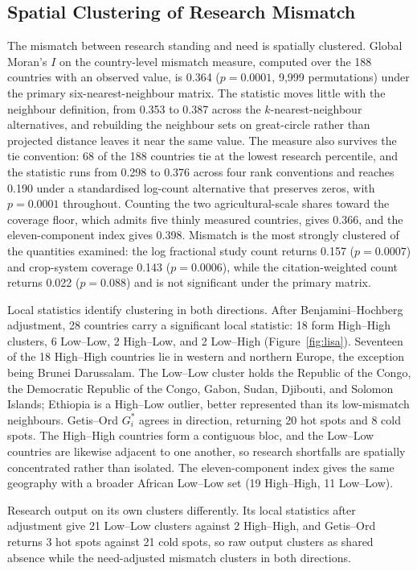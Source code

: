 \documentclass[ASNA,twocolumn]{USG}
\begin{document}
\subsection{Spatial Clustering of Research Mismatch}

The mismatch between research standing and need is spatially clustered. Global Moran's $I$ on the country-level mismatch measure, computed over the 188 countries with an observed value, is 0.364 ($p = 0.0001$, 9,999 permutations)
under the primary six-nearest-neighbour matrix. The statistic moves little with the neighbour
definition, from 0.353 to 0.387 across the $k$-nearest-neighbour alternatives, and rebuilding the
neighbour sets on great-circle rather than projected distance leaves it near the same value. The
measure also survives the tie convention: 68 of the 188 countries tie at the lowest research
percentile, and the statistic runs from 0.298 to 0.376 across four rank conventions and reaches
0.190 under a standardised log-count alternative that preserves zeros, with $p = 0.0001$ throughout.
Counting the two agricultural-scale shares toward the coverage floor, which admits five thinly
measured countries, gives 0.366, and the eleven-component index gives 0.398. Mismatch is the
most strongly clustered of the quantities examined: the log fractional study count returns
0.157 ($p = 0.0007$) and crop-system coverage 0.143 ($p = 0.0006$), while the
citation-weighted count returns 0.022 ($p = 0.088$) and is not significant under the primary
matrix.

Local statistics identify clustering in both directions. After Benjamini--Hochberg adjustment, 28 countries carry a significant local statistic: 18 form
High--High clusters, 6 Low--Low, 2 High--Low, and 2 Low--High (Figure~\ref{fig:lisa}). Seventeen
of the 18 High--High countries lie in western and northern Europe, the exception being Brunei
Darussalam. The Low--Low cluster holds the Republic of the Congo, the Democratic Republic of the
Congo, Gabon, Sudan, Djibouti, and Solomon Islands; Ethiopia is a High--Low outlier, better
represented than its low-mismatch neighbours. Getis--Ord $G^{*}_{i}$ agrees in direction, returning 20 hot spots and 8 cold spots. The
High--High countries form a contiguous bloc, and the Low--Low countries are likewise adjacent to
one another, so research shortfalls are spatially concentrated rather than isolated. The
eleven-component index gives the same geography with a broader African Low--Low set (19
High--High, 11 Low--Low).

Research output on its own clusters differently. Its local statistics after adjustment give 21
Low--Low clusters against 2 High--High, and Getis--Ord returns 3 hot spots against 21 cold
spots, so raw output clusters as shared absence while the need-adjusted mismatch clusters in
both directions.
\end{document}
